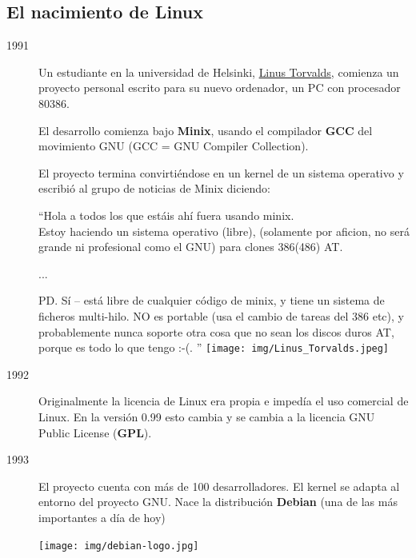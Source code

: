\documentclass{../../../yukibook.cls/yukibook}
\begin{document}
\subsection{El nacimiento de Linux}
\begin{description}

\item[1991] Un estudiante en la universidad de Helsinki, \href{https://en.wikipedia.org/wiki/Linus_Torvalds}{Linus Torvalds}, comienza un proyecto personal escrito para su nuevo ordenador, un PC con procesador 80386.

El desarrollo comienza bajo \textbf{Minix}, usando el compilador \textbf{GCC} del movimiento GNU (GCC = GNU Compiler Collection).

El proyecto termina convirtiéndose en un kernel de un sistema operativo y escribió al grupo de noticias de Minix diciendo:

\begin{tcolorbox}[title=Email de Linus Torvalds presentando Linux,sidebyside,righthand width=0.30\linewidth]
  “Hola a todos los que estáis ahí fuera usando minix.\\


  Estoy haciendo un sistema operativo (libre), (solamente por aficion, no será grande ni profesional como el GNU) para clones 386(486) AT.

  ...

  PD. Sí – está libre de cualquier código de minix, y tiene un sistema de ficheros multi-hilo. NO es portable (usa el cambio de tareas del 386 etc), y probablemente nunca soporte otra cosa que no sean los discos duros AT, porque es todo lo que tengo :-(. ”
  \tcblower
  \texttt{[image: img/Linus\_Torvalds.jpeg]}
  \vspace{-30pt}
\end{tcolorbox}


\item[1992] Originalmente la licencia de Linux era propia e impedía el uso comercial de Linux. En la versión 0.99 esto cambia y se cambia a la licencia GNU Public License (\textbf{GPL}).

\item[1993] El proyecto cuenta con más de 100 desarrolladores. El kernel se adapta al entorno del proyecto GNU. Nace la distribución \textbf{Debian} (una de las más importantes a día de hoy)

\begin{center}
  \texttt{[image: img/debian-logo.jpg]}
  \vspace{-10pt}
\end{center}


\end{description}
\end{document}
